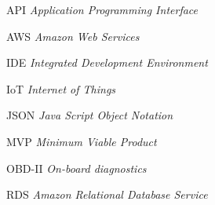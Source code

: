 
\begin{basedescript}{\desclabelstyle{\pushlabel}\desclabelwidth{6em}}
\item[{API}] \textit{Application Programming Interface}
\item[{AWS}] \textit{Amazon Web Services}
\item[{IDE}] \textit{Integrated Development Environment}
\item[{IoT}] \textit{Internet of Things}
\item[{JSON}] \textit{Java Script Object Notation}
\item[{MVP}] \textit{Minimum Viable Product}
\item[{OBD-II}] \textit{On-board diagnostics}
\item[{RDS}] \textit{Amazon Relational Database Service}

\end{basedescript}